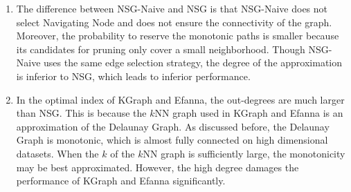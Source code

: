 \documentclass{vldb}
\begin{document}
\begin{enumerate}

\item The difference between NSG-Naive and NSG is that NSG-Naive does not select Navigating Node and does not ensure the connectivity of the graph. Moreover, the probability to reserve the monotonic paths is smaller because its candidates for pruning only cover a small neighborhood. Though NSG-Naive uses the same edge selection strategy, the degree of the approximation is inferior to NSG, which leads to inferior performance. 

\item In the optimal index of KGraph and Efanna, the out-degrees are much larger than NSG. This is because the $k$NN graph used in KGraph and Efanna is an approximation of the Delaunay Graph. As discussed before, the Delaunay Graph is monotonic, which is almost fully connected on high dimensional datasets. When the $k$ of the $k$NN graph is sufficiently large, the monotonicity may be best approximated. However, the high degree damages the performance of KGraph and Efanna significantly.
\end{enumerate}










\end{document}
